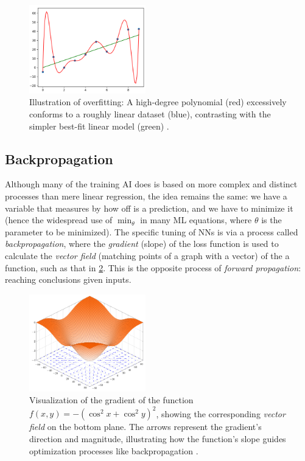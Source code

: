 \documentclass[conference]{IEEEtran}
\begin{document}
\begin{figure}[htbp]
    \centering
    \includegraphics[width=0.45\textwidth]{images/overfitting.png}
    \caption{Illustration of overfitting: A high-degree polynomial (red) excessively conforms to a roughly linear dataset (blue), contrasting with the simpler best-fit linear model (green) \cite{fig-overfitting}.}
\label{fig:overfitting}
\end{figure}

\subsection{Backpropagation}
Although many of the training AI does is based on more complex and distinct processes than mere linear regression, the idea remains the same: we have a variable that measures by how off is a prediction, and we have to minimize it (hence the widespread use of $\displaystyle\min_{\theta}$ in many ML equations, where $\theta$ is the parameter to be minimized). The specific tuning of NNs is via a process called \textit{backpropagation}, where the \textit{gradient} (slope) of the loss function is used to calculate the \textit{vector field} (matching points of a graph with a vector) of the a function, such as that in \cref{fig:gradient_vectorfield}. This is the opposite process of \textit{forward propagation}: reaching conclusions given inputs.

\begin{figure}[htbp]
    \centering
    \includegraphics[width=0.45\textwidth]{images/3d-gradient-cos.png}
    \caption{Visualization of the gradient of the function $f(x, y) = -(\cos^2 x + \cos^2 y)^2$, showing the corresponding \textit{vector field} on the bottom plane. The arrows represent the gradient’s direction and magnitude, illustrating how the function’s slope guides optimization processes like backpropagation \cite{fig-gradient_vectorfield}.}
\label{fig:gradient_vectorfield}
\end{figure}
\end{document}
